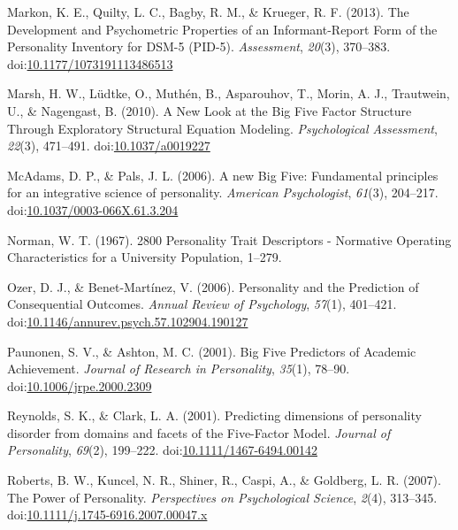 \documentclass[man]{apa6}
\theoremstyle{definition}
\theoremstyle{definition}
\theoremstyle{definition}
\theoremstyle{remark}
\begin{document}
\leavevmode\hypertarget{ref-Markon2013}{}%
Markon, K. E., Quilty, L. C., Bagby, R. M., \& Krueger, R. F. (2013).
The Development and Psychometric Properties of an Informant-Report Form
of the Personality Inventory for DSM-5 (PID-5). \emph{Assessment},
\emph{20}(3), 370--383.
doi:\href{https://doi.org/10.1177/1073191113486513}{10.1177/1073191113486513}

\leavevmode\hypertarget{ref-Marsh2010}{}%
Marsh, H. W., Lüdtke, O., Muthén, B., Asparouhov, T., Morin, A. J.,
Trautwein, U., \& Nagengast, B. (2010). A New Look at the Big Five
Factor Structure Through Exploratory Structural Equation Modeling.
\emph{Psychological Assessment}, \emph{22}(3), 471--491.
doi:\href{https://doi.org/10.1037/a0019227}{10.1037/a0019227}

\leavevmode\hypertarget{ref-McAdams2006a}{}%
McAdams, D. P., \& Pals, J. L. (2006). A new Big Five: Fundamental
principles for an integrative science of personality. \emph{American
Psychologist}, \emph{61}(3), 204--217.
doi:\href{https://doi.org/10.1037/0003-066X.61.3.204}{10.1037/0003-066X.61.3.204}

\leavevmode\hypertarget{ref-Norman1967}{}%
Norman, W. T. (1967). 2800 Personality Trait Descriptors - Normative
Operating Characteristics for a University Population, 1--279.

\leavevmode\hypertarget{ref-OzerBenet2006}{}%
Ozer, D. J., \& Benet-Martínez, V. (2006). Personality and the
Prediction of Consequential Outcomes. \emph{Annual Review of
Psychology}, \emph{57}(1), 401--421.
doi:\href{https://doi.org/10.1146/annurev.psych.57.102904.190127}{10.1146/annurev.psych.57.102904.190127}

\leavevmode\hypertarget{ref-Paunonen2001}{}%
Paunonen, S. V., \& Ashton, M. C. (2001). Big Five Predictors of
Academic Achievement. \emph{Journal of Research in Personality},
\emph{35}(1), 78--90.
doi:\href{https://doi.org/10.1006/jrpe.2000.2309}{10.1006/jrpe.2000.2309}

\leavevmode\hypertarget{ref-ClarkReynolds2001}{}%
Reynolds, S. K., \& Clark, L. A. (2001). Predicting dimensions of
personality disorder from domains and facets of the Five-Factor Model.
\emph{Journal of Personality}, \emph{69}(2), 199--222.
doi:\href{https://doi.org/10.1111/1467-6494.00142}{10.1111/1467-6494.00142}

\leavevmode\hypertarget{ref-Roberts2007a}{}%
Roberts, B. W., Kuncel, N. R., Shiner, R., Caspi, A., \& Goldberg, L. R.
(2007). The Power of Personality. \emph{Perspectives on Psychological
Science}, \emph{2}(4), 313--345.
doi:\href{https://doi.org/10.1111/j.1745-6916.2007.00047.x}{10.1111/j.1745-6916.2007.00047.x}
\end{document}
